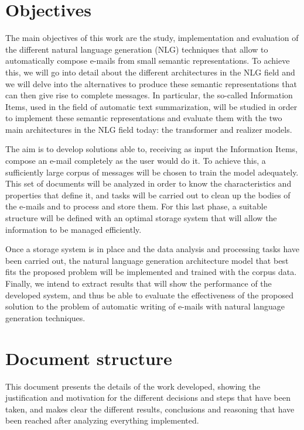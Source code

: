 \section{Objectives}\label{obje}
The main objectives of this work are the study, implementation and evaluation of the different natural language generation (NLG) techniques that allow to automatically compose e-mails from small semantic representations. To achieve this, we will go into detail about the different architectures in the NLG field and we will delve into the alternatives to produce these semantic representations that can then give rise to complete messages. In particular, the so-called Information Items, used in the field of automatic text summarization, will be studied in order to implement these semantic representations and evaluate them with the two main architectures in the NLG field today: the transformer and realizer models.

The aim is to develop solutions able to, receiving as input the Information Items, compose an e-mail completely as the user would do it. To achieve this, a sufficiently large corpus of messages will be chosen to train the model adequately. This set of documents will be analyzed in order to know the characteristics and properties that define it, and tasks will be carried out to clean up the bodies of the e-mails and to process and store them. For this last phase, a suitable structure will be defined with an optimal storage system that will allow the information to be managed efficiently.

Once a storage system is in place and the data analysis and processing tasks have been carried out, the natural language generation architecture model that best fits the proposed problem will be implemented and trained with the corpus data. Finally, we intend to extract results that will show the performance of the developed system, and thus be able to evaluate the effectiveness of the proposed solution to the problem of automatic writing of e-mails with natural language generation techniques.

\section{Document structure}\label{structure}
This document presents the details of the work developed, showing the justification and motivation for the different decisions and steps that have been taken, and makes clear the different results, conclusions and reasoning that have been reached after analyzing everything implemented.

